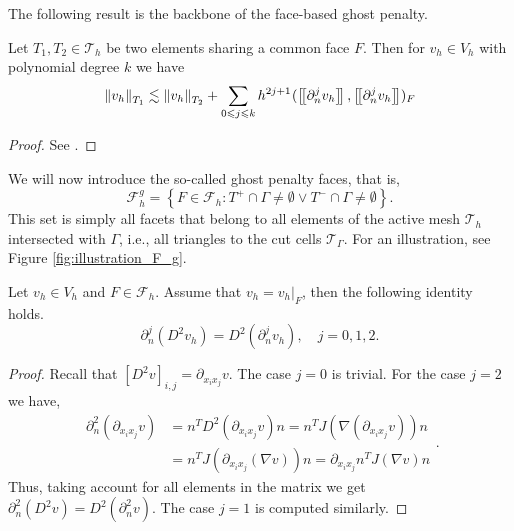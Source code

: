 The following result is the backbone of the face-based ghost penalty.
\begin{lemma}
    \label{lemma:bi_local_facet_estimate}
    Let $T_{1},T_{2 } \in  \mathcal{T} _{h}$ be two elements sharing a common face $F$. Then for $v_{h} \in V_{h}$ with polynomial degree $k$  we have
    \begin{equation}
    \| v_{h} \|_{ T_{1} }^{  }  \lesssim \| v_{h} \|_{ T_{2} }^{  } + \sum_{0\leqslant j\leqslant k}  {h^{2j +1}}^{} ( \left[\!\left[  \partial _{n}^{j} v_{h}  \right]\!\right], \left[\!\left[  \partial ^{j}_{n} v_{h}  \right]\!\right]    )_{F}
    \end{equation}

\end{lemma}
\begin{proof}
    See \cite[Lemma 2.19]{gurkan2019stabilized}.
\end{proof}

We will now introduce the so-called ghost penalty faces, that is, \[
\mathcal{F} ^{g}_{h} = \left\{ F\in \mathcal{F} _{h} : T^{+}\cap \Gamma \neq \emptyset  \vee T^{-}\cap \Gamma \neq \emptyset  \right\}.
\]
This set is simply all facets that belong to all elements of the active mesh $\mathcal{T} _{h}$  intersected with $\Gamma $, i.e., all triangles to the cut cells $\mathcal{T} _{\Gamma }$. For an illustration, see Figure \ref{fig:illustration_F_g}.

\begin{proposition}
    \label{prop:hessian_change}
    Let $v_{h} \in V_{h} $ and $F \in  \mathcal{F} _{h}$. Assume that $ v_{h} = v_{h} |_{F}$,  then the following identity holds.
    \begin{equation}
    \partial ^{j}_{n} (D^2v_{h}) = D^2 ( \partial ^{j}_{n} v_{h}), \quad  j=0,1,2.
    \end{equation}
\end{proposition}

\begin{proof}

        Recall that $\left[ D^2 v \right]_{i,j} = \partial _{x_{i}x_{j}} v $. The case $j=0$ is trivial. For the case $j=2$ we have,
        \begin{equation}
                \begin{split}
                \partial^{2} _{n} (\partial _{x_{i} x_{j}} v) & = n^{T}  D^2(\partial _{x_{i} x_{j}} v) n = n^{T}  J( \nabla (\partial _{x_{i} x_{j}}v) ) n \\
                & =  n^{T}  J(\partial _{x_{i} x_{j}}(\nabla v) ) n = \partial _{x_{i} x_{j}} n^{T} J(\nabla v) n
                \end{split}.
        \end{equation}
            Thus, taking account for all elements in the matrix we get $\partial^{2} _{n} (D^2v) = D^2( \partial^{2} _{n}v)$. The case $j=1$ is computed similarly.

\end{proof}

